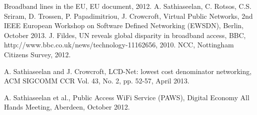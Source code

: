 \documentclass[conference]{IEEEtran}
\begin{document}
%
%
\begin{thebibliography}{15}







Broadband lines in the EU, EU document, 2012.
A. Sathiaseelan, C. Rotsos, C.S. Sriram, D. Trossen, P. Papadimitriou, J. Crowcroft, Virtual Public Networks, 2nd IEEE European Workshop on Software Defined Networking (EWSDN), Berlin, October 2013.
 J. Fildes, UN reveals global disparity in broadband access, BBC, http://www.bbc.co.uk/news/technology-11162656, 2010.
 NCC, Nottingham Citizens Survey, 2012.

A. Sathiaseelan and J. Crowcroft, LCD-Net: lowest cost denominator networking, ACM SIGCOMM CCR Vol. 43, No. 2,  pp. 52-57, April 2013.

A. Sathiaseelan et al., Public Access WiFi Service (PAWS), Digital Economy All Hands Meeting, Aberdeen, October 2012.






\end{thebibliography}
\end{document}
